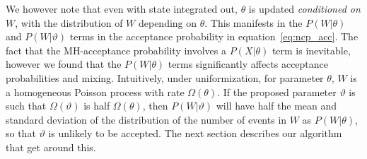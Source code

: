 We however note that even with state integrated out, $\theta$ is updated {\em conditioned on $W$}, with the distribution of $W$ depending on $\theta$. 
This manifests in the $P(W|\theta)$ and $P(W|\vartheta)$ terms in the acceptance probability in equation~\eqref{eq:ncp_acc}. 
The fact that the MH-acceptance probability involves a $P(X|\theta)$ term is inevitable, however we found that the $P(W|\theta)$ terms significantly affects acceptance probabilities and mixing. 
Intuitively, under uniformization, for parameter $\theta$, $W$ is a homogeneous Poisson process with rate $\Omega(\theta)$. 
If the proposed parameter $\vartheta$ is such that $\Omega(\vartheta)$ is half $\Omega(\theta)$, then $P(W|\vartheta)$ will have half the mean and standard deviation of the distribution of the number of events in $W$ as $P(W|\theta)$, so that $\vartheta$ is unlikely to be accepted. 
The next section describes our algorithm that get around this.
